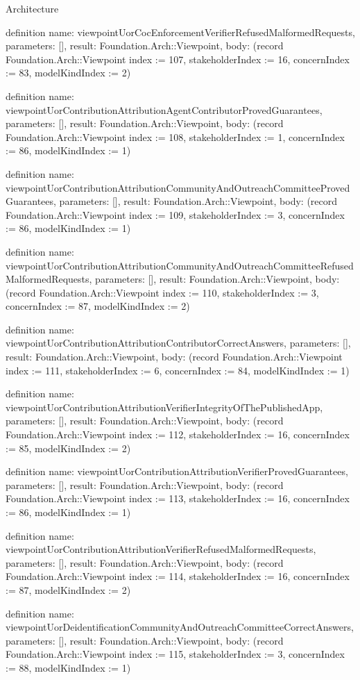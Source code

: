 \begin{lexlean}{Architecture}
\begin{semanticmodule}
definition{
  name: viewpointUorCocEnforcementVerifierRefusedMalformedRequests,
  parameters: [],
  result: Foundation.Arch::Viewpoint,
  body: (record Foundation.Arch::Viewpoint {index := 107, stakeholderIndex := 16, concernIndex := 83, modelKindIndex := 2})
}

definition{
  name: viewpointUorContributionAttributionAgentContributorProvedGuarantees,
  parameters: [],
  result: Foundation.Arch::Viewpoint,
  body: (record Foundation.Arch::Viewpoint {index := 108, stakeholderIndex := 1, concernIndex := 86, modelKindIndex := 1})
}

definition{
  name: viewpointUorContributionAttributionCommunityAndOutreachCommitteeProvedGuarantees,
  parameters: [],
  result: Foundation.Arch::Viewpoint,
  body: (record Foundation.Arch::Viewpoint {index := 109, stakeholderIndex := 3, concernIndex := 86, modelKindIndex := 1})
}

definition{
  name: viewpointUorContributionAttributionCommunityAndOutreachCommitteeRefusedMalformedRequests,
  parameters: [],
  result: Foundation.Arch::Viewpoint,
  body: (record Foundation.Arch::Viewpoint {index := 110, stakeholderIndex := 3, concernIndex := 87, modelKindIndex := 2})
}

definition{
  name: viewpointUorContributionAttributionContributorCorrectAnswers,
  parameters: [],
  result: Foundation.Arch::Viewpoint,
  body: (record Foundation.Arch::Viewpoint {index := 111, stakeholderIndex := 6, concernIndex := 84, modelKindIndex := 1})
}

definition{
  name: viewpointUorContributionAttributionVerifierIntegrityOfThePublishedApp,
  parameters: [],
  result: Foundation.Arch::Viewpoint,
  body: (record Foundation.Arch::Viewpoint {index := 112, stakeholderIndex := 16, concernIndex := 85, modelKindIndex := 2})
}

definition{
  name: viewpointUorContributionAttributionVerifierProvedGuarantees,
  parameters: [],
  result: Foundation.Arch::Viewpoint,
  body: (record Foundation.Arch::Viewpoint {index := 113, stakeholderIndex := 16, concernIndex := 86, modelKindIndex := 1})
}

definition{
  name: viewpointUorContributionAttributionVerifierRefusedMalformedRequests,
  parameters: [],
  result: Foundation.Arch::Viewpoint,
  body: (record Foundation.Arch::Viewpoint {index := 114, stakeholderIndex := 16, concernIndex := 87, modelKindIndex := 2})
}

definition{
  name: viewpointUorDeidentificationCommunityAndOutreachCommitteeCorrectAnswers,
  parameters: [],
  result: Foundation.Arch::Viewpoint,
  body: (record Foundation.Arch::Viewpoint {index := 115, stakeholderIndex := 3, concernIndex := 88, modelKindIndex := 1})
}


\end{semanticmodule}
\end{lexlean}
